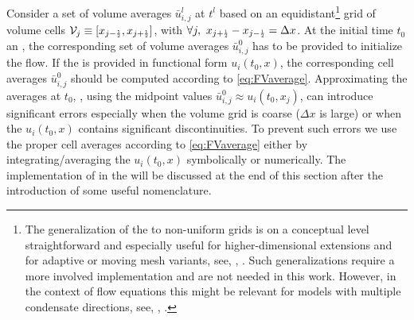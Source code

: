 Consider a set of volume averages $\bar{u}_{i,j}^l$ at $t^l$ based on an equidistant\footnote{%
	The generalization of the \ktScheme{} to non-uniform grids is on a conceptual level straightforward and especially useful for higher-dimensional extensions and for adaptive or moving mesh variants, see, \eg{}, .
	Such generalizations require a more involved implementation and are not needed in this work. 
	However, in the context of \frg{} flow equations this might be relevant for models with multiple condensate directions, see, \eg{}, .
} grid of volume cells ${\mathcal{V}_j \equiv [ x_{j - \ttfrac{1}{2}}, x_{j + \ttfrac{1}{2}} ]}$, with $\forall j, \ x_{j + \ttfrac{1}{2}} - x_{j - \ttfrac{1}{2}}=\Delta x$.
At the initial time $t_0$ an \ic{} \dash{} \ie{}, the corresponding set of volume averages $\bar{u}_{i,j}^0$ \dash{} has to be provided to initialize the flow. 
If the \ic{} is provided in functional form $u_i(t_0,x)$, the corresponding cell averages $\bar{u}_{i,j}^0$ should be computed according to \cref{eq:FVaverage}.
Approximating the averages at $t_0$, \eg{}, using the midpoint values $\bar{u}_{i,j}^0\approx u_i(t_0,x_j)$, can introduce significant errors \dash{} especially when the volume grid is coarse ($\Delta x$ is large) or when the \ic{} $u_i(t_0,x)$ contains significant discontinuities. 
To prevent such errors we use the proper cell averages according to \cref{eq:FVaverage} either by integrating/averaging the \ic{} $u_i(t_0,x)$ symbolically or numerically.
The implementation of \bcs{} in the \ktScheme{} will be discussed at the end of this section after the introduction of some useful nomenclature.

